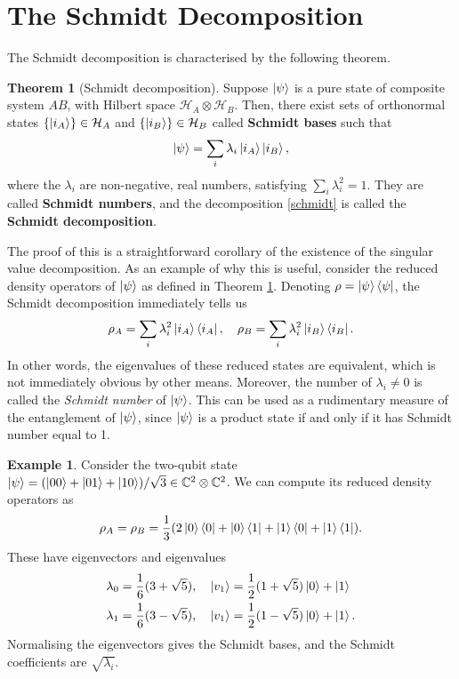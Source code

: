 \documentclass[12pt,a4paper]{report}
\numberwithin{equation}{section}
\newcommand{\ketbra}[2]{\ket{#1}\bra{#2}}
\newcommand{\ketbras}[1]{\ketbra{#1}{#1}}
\theoremstyle{definition}
\theoremstyle{theorem}
\newtheorem{theorem}{Theorem}[section]
\theoremstyle{theorem}
\theoremstyle{example}
\newtheorem{example}{Example}[section]
\theoremstyle{definition}
\begin{document}
\section{The Schmidt Decomposition}
The Schmidt decomposition is characterised by the following theorem.
\begin{theorem}[Schmidt decomposition]\label{Schmidt}
	Suppose $\ket{\psi}$ is a pure state of composite system $AB$, with Hilbert space $\mathcal{H}_{A}\otimes\mathcal{H}_{B}$. Then, there exist sets of orthonormal states $\{\ket{i_{A}}\}\in\mathcal{H}_{A}$ and $\{\ket{i_{B}}\}\in\mathcal{H}_{B}$ called \textbf{Schmidt bases} such that
	\begin{equation}\label{schmidt}
		\ket{\psi}=\sum_{i}\lambda_{i}\ket{i_{A}}\ket{i_{B}},
	\end{equation}
	where the $\lambda_{i}$ are non-negative, real numbers, satisfying $\sum_{i}\lambda_{i}^{2}=1$. They are called \textbf{Schmidt numbers}, and the decomposition \ref{schmidt} is called the \textbf{Schmidt decomposition}.
\end{theorem}
The proof of this is a straightforward corollary of the existence of the singular value decomposition. As an example of why this is useful, consider the reduced density operators of $\ket{\psi}$ as defined in Theorem \ref{Schmidt}. Denoting $\rho=\ketbras{\psi}$, the Schmidt decomposition immediately tells us
\begin{equation}
	\rho_{A}=\sum_{i}\lambda_{i}^{2}\ketbras{i_{A}},\quad\rho_{B}=\sum_{i}\lambda_{i}^{2}\ketbras{i_{B}}.
\end{equation}
In other words, the eigenvalues of these reduced states are equivalent, which is not immediately obvious by other means. Moreover, the number of $\lambda_{i}\neq 0$ is called the \textit{Schmidt number} of $\ket{\psi}$. This can be used as a rudimentary measure of the entanglement of $\ket{\psi}$, since $\ket{\psi}$ is a product state if and only if it has Schmidt number equal to 1.
\begin{example}
	Consider the two-qubit state $\ket{\psi}=(\ket{00}+\ket{01}+\ket{10})/\sqrt{3}\in\mathbb{C}^{2}\otimes\mathbb{C}^{2}$. We can compute its reduced density operators as
	\begin{equation}
		\rho_{A}=\rho_{B}=\frac{1}{3}(2\ketbras{0}+\ketbra{0}{1}+\ketbra{1}{0}+\ketbras{1}).
	\end{equation}
	These have eigenvectors and eigenvalues
	\begin{equation}
		\begin{aligned}
			\lambda_{0}=\frac{1}{6}(3+\sqrt{5}),&\quad\ket{v_{1}}=\frac{1}{2}(1+\sqrt{5})\ket{0}+\ket{1}\\
			\lambda_{1}=\frac{1}{6}(3-\sqrt{5}),&\quad\ket{v_{1}}=\frac{1}{2}(1-\sqrt{5})\ket{0}+\ket{1}.
		\end{aligned}
	\end{equation}
	Normalising the eigenvectors gives the Schmidt bases, and the Schmidt coefficients are $\sqrt{\lambda_{i}}$.
\end{example}
\end{document}

